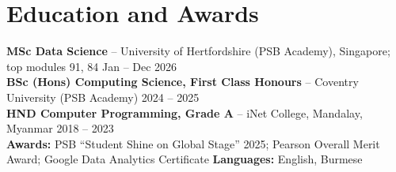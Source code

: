 \documentclass[letterpaper,10pt]{article}
\begin{document}
\section*{Education and Awards}
\textbf{MSc Data Science} -- University of Hertfordshire (PSB Academy), Singapore; top modules 91, 84 \hfill Jan -- Dec 2026\\
\textbf{BSc (Hons) Computing Science, First Class Honours} -- Coventry University (PSB Academy) \hfill 2024 -- 2025\\
\textbf{HND Computer Programming, Grade A} -- iNet College, Mandalay, Myanmar \hfill 2018 -- 2023\\
\textbf{Awards:} PSB ``Student Shine on Global Stage'' 2025; Pearson Overall Merit Award; Google Data Analytics Certificate \textbar{} \textbf{Languages:} English, Burmese
\end{document}
